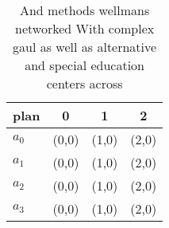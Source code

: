 \documentclass[a4paper]{article}
\begin{document}
\begin{table}
\begin{adjustbox}{width=0.9\columnwidth}
\begin{tabular}{|l|l|l|l|}
\hline
\textbf{plan} & \multicolumn{1}{c|}{\textbf{0}} & \multicolumn{1}{c|}{\textbf{1}} & \multicolumn{1}{c|}{\textbf{2}} \\ \hline
\textbf{$a_0$}  & (0,0) & (1,0) & (2,0) \\ \hline
\textbf{$a_1$}  & (0,0) & (1,0) & (2,0) \\ \hline
\textbf{$a_2$}  & (0,0) & (1,0) & (2,0) \\ \hline
\textbf{$a_3$}  & (0,0) & (1,0) & (2,0) \\ \hline
\end{tabular}
\end{adjustbox}
\caption{And methods wellmans networked With complex gaul as well as alternative and special education centers across 
}
\end{table}
\end{document}
